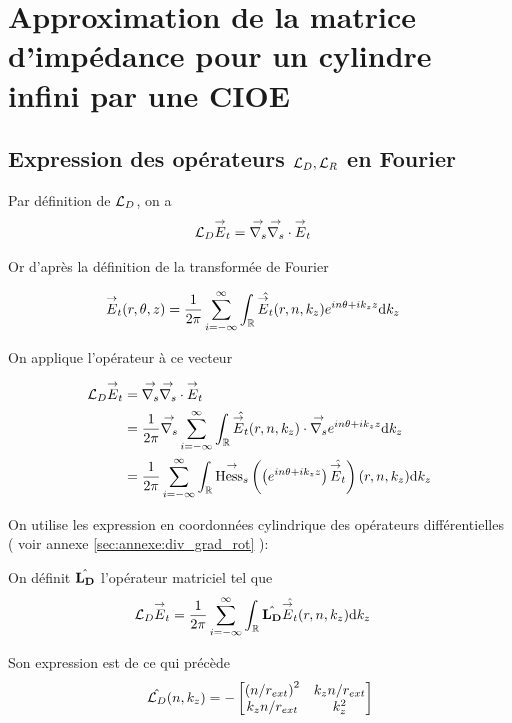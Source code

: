 \section{Approximation de la matrice d'impédance pour un cylindre infini par une CIOE}

  \subsection[Expression des opérateurs LD,LR en Fourier]{Expression des opérateurs \({\mathcal{L}_D},{\mathcal{L}_R}\) en Fourier}

    Par définition de \({\mathcal{L}_D}\), on a
    \begin{align}
      {\mathcal{L}_D} {\overset{\rightarrow}{E}}_t & = {\overset{\rightarrow}{\nabla_s}}{} {\overset{\rightarrow}{\nabla_s}} \cdot{} {\overset{\rightarrow}{E}}_t
    \end{align}

    Or d’après la définition de la transformée de Fourier

    \begin{align}
      {\overset{\rightarrow}{E}}_t(r,\theta,z) & = \dfrac{1}{2\pi}\sum_{i=-\infty}^\infty \int_\mathbb R \hat{{\overset{\rightarrow}{E}}_t}(r,n,k_z)e^{in\theta + ik_zz}\mathrm{d}{k_z}
    \end{align}

    On applique l'opérateur à ce vecteur

    \begin{align}
      {\mathcal{L}_D} {\overset{\rightarrow}{E}}_t
      & = {\overset{\rightarrow}{\nabla_s}}{} {\overset{\rightarrow}{\nabla_s}} \cdot{} {\overset{\rightarrow}{E}}_t
      \\
      &=\dfrac{1}{2\pi}{\overset{\rightarrow}{\nabla_s}}{} \sum_{i=-\infty}^\infty\int_\mathbb R \hat{{\overset{\rightarrow}{E}}_t}(r,n,k_z) \cdot {\overset{\rightarrow}{\nabla_s}}{} e^{in\theta + ik_zz}\mathrm{d}{k_z}
      \\
      &=\dfrac{1}{2\pi}\sum_{i=-\infty}^\infty \int_\mathbb R {\overset{\rightarrow}{\operatorname{Hess}_s}}{}\left(\left( e^{in\theta + ik_zz} \right) \hat{{\overset{\rightarrow}{E}}_t}\right)(r,n,k_z)\mathrm{d}{k_z}
    \end{align}

    On utilise les expression en coordonnées cylindrique des opérateurs différentielles ( voir annexe \ref{sec:annexe:div_grad_rot} ):

    On définit \(\hat{\mathbf{L_D}}\) l'opérateur matriciel tel que
    \begin{align}
      {\mathcal{L}_D} {\overset{\rightarrow}{E}}_t
      &= \dfrac{1}{2\pi}\sum_{i=-\infty}^\infty\int_\mathbb R \hat{\mathbf{L_D}} \hat{{\overset{\rightarrow}{E}}_t}(r,n,k_z)\mathrm{d}{k_z}
    \end{align}

    Son expression est de ce qui précède
    \begin{equation}
      \label{eq:cylindre:fourier:LD}
      \hat{{\mathcal{L}_D}}(n,k_z) = -
      \begin{bmatrix}
        \left({n}\slash{r_{ext}}\right)^2 & k_z{n}\slash{r_{ext}}
        \\
        k_z{n}\slash{r_{ext}} & k_z^2
      \end{bmatrix}
    \end{equation}

